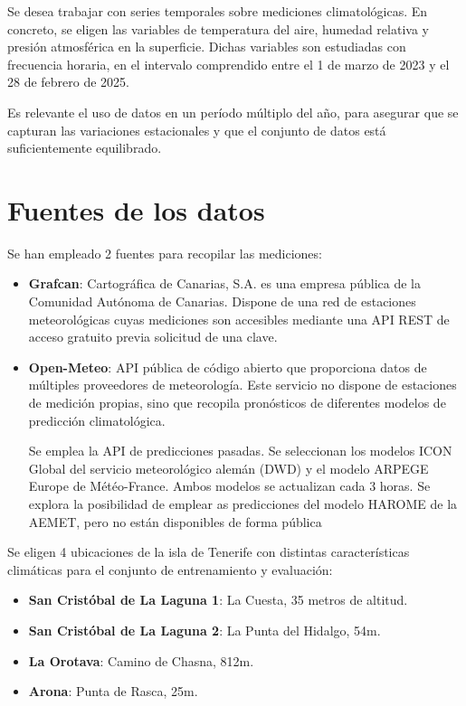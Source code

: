 
Se desea trabajar con series temporales sobre mediciones climatológicas. 
En concreto, se eligen las variables de temperatura del aire, humedad relativa y presión atmosférica en la superficie.
Dichas variables son estudiadas con frecuencia horaria, en el intervalo comprendido entre el 1 de marzo de 2023 y el 28 de febrero de 2025.

Es relevante el uso de datos en un período múltiplo del año, para asegurar que se capturan las variaciones estacionales y que el conjunto de datos está suficientemente equilibrado.

\section{Fuentes de los datos}

Se han empleado 2 fuentes para recopilar las mediciones: 
\begin{itemize}
    \item \textbf{Grafcan}: Cartográfica de Canarias, S.A. es una empresa pública de la Comunidad Autónoma de Canarias. Dispone de una red de estaciones meteorológicas cuyas
    mediciones son accesibles mediante una API REST de acceso gratuito previa solicitud de una clave\cite{grafcan_sensores}. 
    \item \textbf{Open-Meteo}: API pública de código abierto que proporciona datos de múltiples proveedores de meteorología. Este servicio no dispone de estaciones de medición
    propias, sino que recopila pronósticos de diferentes modelos de predicción climatológica. 

    Se emplea la API de predicciones pasadas\cite{open_meteo_api}. Se seleccionan los modelos ICON Global del servicio meteorológico alemán (DWD) y el modelo ARPEGE Europe de Météo-France. Ambos modelos se actualizan cada 3 horas. 
    Se explora la posibilidad de emplear as predicciones del modelo HAROME de la AEMET, pero no están disponibles de forma pública
\end{itemize}

Se eligen 4 ubicaciones de la isla de Tenerife con distintas características climáticas para el conjunto de entrenamiento y evaluación:
\begin{itemize}
    \item \textbf{San Cristóbal de La Laguna 1}: La Cuesta, 35 metros de altitud.
    \item \textbf{San Cristóbal de La Laguna 2}: La Punta del Hidalgo, 54m.
    \item \textbf{La Orotava}: Camino de Chasna, 812m.
    \item \textbf{Arona}: Punta de Rasca, 25m.
\end{itemize}

